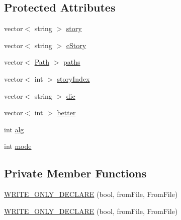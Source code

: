 \subsection*{Protected Attributes}
\begin{DoxyCompactItemize}
\item 
vector$<$ string $>$ \hyperlink{class_a_p_p_ac5841d717fc07ad656b743f86336b8a5}{story}
\item 
vector$<$ string $>$ \hyperlink{class_a_p_p_a599d2539b3815e510bf1f1be28e4047f}{c\+Story}
\item 
vector$<$ \hyperlink{struct_path}{Path} $>$ \hyperlink{class_a_p_p_aa2aee15bbba3ab5ba5b6c9e120068a0e}{paths}
\item 
vector$<$ int $>$ \hyperlink{class_a_p_p_abe393707ad5d1aa537ddbb4428b84c32}{story\+Index}
\item 
vector$<$ string $>$ \hyperlink{class_a_p_p_ad434309fd56f06dace1a73e0a8b069d9}{dic}
\item 
vector$<$ int $>$ \hyperlink{class_a_p_p_a5ab0c5c949700e522f41ee4a8c35de52}{better}
\item 
int \hyperlink{class_a_p_p_a09ff32362a370e70a2b0c8dfc2f4b406}{alg}
\item 
int \hyperlink{class_a_p_p_a799513151a59f01ffcbbf5ba85a2d1c6}{mode}
\end{DoxyCompactItemize}
\subsection*{Private Member Functions}
\begin{DoxyCompactItemize}
\item 
\hyperlink{class_a_p_p_a93969636f8cee0d293fc8817843532f2}{W\+R\+I\+T\+E\+\_\+\+O\+N\+L\+Y\+\_\+\+D\+E\+C\+L\+A\+R\+E} (bool, from\+File, From\+File)
\item 
\hyperlink{class_a_p_p_a93969636f8cee0d293fc8817843532f2}{W\+R\+I\+T\+E\+\_\+\+O\+N\+L\+Y\+\_\+\+D\+E\+C\+L\+A\+R\+E} (bool, from\+File, From\+File)
\end{DoxyCompactItemize}


